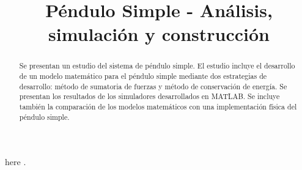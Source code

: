 \documentclass[journal, onecolumn]{IEEEtran}
\begin{document}
\title{
Péndulo Simple - Análisis, simulación y construcción\\
}


\author{
}

\maketitle

\begin{abstract}



Se presentan un estudio del sistema de péndulo simple.
El estudio incluye el desarrollo de un modelo matemático
para el péndulo simple mediante dos estrategias de desarrollo:
método de sumatoria de fuerzas y método de conservación de energía.
Se presentan los resultados de los simuladores desarrollados 
en MATLAB.
Se incluye también la comparación de los modelos matemáticos 
con una implementación física del péndulo simple.

\end{abstract}










here \cite{susskind}.



\end{document}
